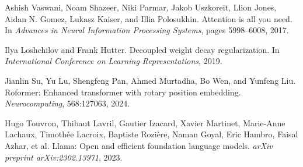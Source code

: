 \documentclass[11pt,a4paper]{article}
\begin{document}
\begin{thebibliography}{9}

Ashish Vaswani, Noam Shazeer, Niki Parmar, Jakob Uszkoreit, Llion Jones, Aidan N. Gomez, Lukasz Kaiser, and Illia Polosukhin.
\newblock Attention is all you need.
\newblock In \emph{Advances in Neural Information Processing Systems}, pages 5998--6008, 2017.

Ilya Loshchilov and Frank Hutter.
\newblock Decoupled weight decay regularization.
\newblock In \emph{International Conference on Learning Representations}, 2019.

Jianlin Su, Yu Lu, Shengfeng Pan, Ahmed Murtadha, Bo Wen, and Yunfeng Liu.
\newblock Roformer: Enhanced transformer with rotary position embedding.
\newblock \emph{Neurocomputing}, 568:127063, 2024.

Hugo Touvron, Thibaut Lavril, Gautier Izacard, Xavier Martinet, Marie-Anne Lachaux, Timothée Lacroix, Baptiste Rozière, Naman Goyal, Eric Hambro, Faisal Azhar, et al.
\newblock Llama: Open and efficient foundation language models.
\newblock \emph{arXiv preprint arXiv:2302.13971}, 2023.

\end{thebibliography}
\end{document}
